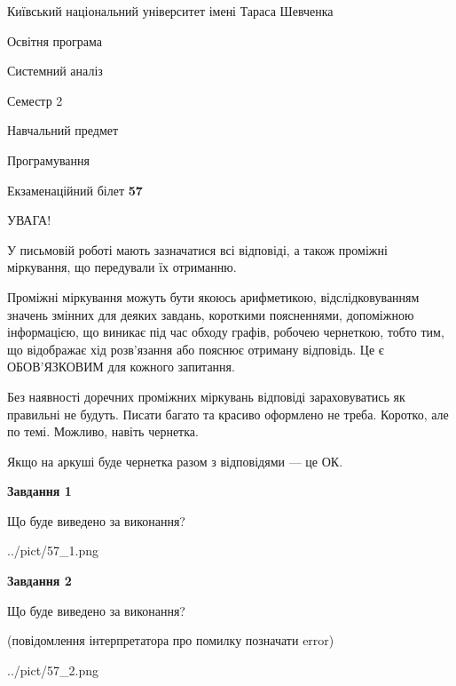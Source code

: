 \documentclass[12pt, ukrainian]{article}
\begin{document}
{{\begin {small}\par
{ \center  Київський національний університет імені Тараса Шевченка \par}
{\parbox {5 cm}{Освітня програма \hfill}{\parbox {7 cm}{Системний аналіз \hfill}}\parbox {6 cm}{\hfill Семестр 2}}\par
{\parbox {5 cm} {Навчальний предмет \hfill}\parbox {7 cm}{Програмування \hfill}\parbox {6cm}{\hfill}\par}\vspace{-7pt} \end{small}}{\center Екзаменаційний білет \No \textbf
{ 57 }\par}}
{
\begin {large}
УВАГА!

У письмовій роботі мають зазначатися всі відповіді, а також проміжні міркування, що передували їх отриманню.

Проміжні міркування можуть бути якоюсь арифметикою, відслідковуванням зна\-чень змінних для деяких завдань,
короткими поясненнями, допоміжною інформацією, що виникає під час обходу графів, робочею чернеткою,
тобто тим, що відображає хід розв’язання або пояснює отриману відповідь.
Це є ОБОВ’ЯЗКОВИМ для кожного запитання.

Без наявності доречних проміжних міркувань відповіді зараховуватись як правиль\-ні не будуть.
Писати багато та красиво оформлено не треба. Коротко, але по темі. Можли\-во, навіть чернетка.

Якщо на аркуші буде чернетка разом з відповідями --- це ОК.

\newpage

{\begin {center}\textbf{Завдання 1}\end {center}}\par
Що буде виведено за виконання?\par
\begin{center}
	{../pict/57_1.png}
\end{center}
\newpage

{\begin {center}\textbf{Завдання 2}\end {center}}\par
Що буде виведено за виконання?\par
 (повідомлення інтерпретатора про помилку позначати error)\par
\begin{center}
	{../pict/57_2.png}
\end{center}
\newpage


\end{large}}
\end{document}
